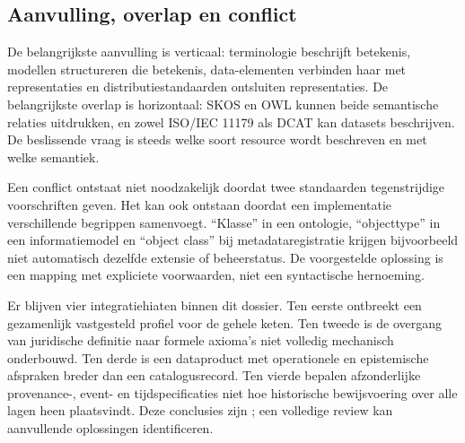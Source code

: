 \subsection{Aanvulling, overlap en conflict}
De belangrijkste aanvulling is verticaal: terminologie beschrijft betekenis, modellen structureren die betekenis, data-elementen verbinden haar met representaties en distributiestandaarden ontsluiten representaties. De belangrijkste overlap is horizontaal: SKOS en OWL kunnen beide semantische relaties uitdrukken, en zowel ISO/IEC 11179 als DCAT kan datasets beschrijven. De beslissende vraag is steeds welke soort resource wordt beschreven en met welke semantiek. \citep{S31,S30,S09,S47}

Een conflict ontstaat niet noodzakelijk doordat twee standaarden tegenstrijdige voorschriften geven. Het kan ook ontstaan doordat een implementatie verschillende begrippen samenvoegt. ``Klasse'' in een ontologie, ``objecttype'' in een informatiemodel en ``object class'' bij metadata\-registratie krijgen bijvoorbeeld niet automatisch dezelfde extensie of beheerstatus. \citep{S30,S13,S08} De voorgestelde oplossing is een mapping met expliciete voorwaarden, niet een syntactische hernoeming.

Er blijven vier integratiehiaten binnen dit dossier. Ten eerste ontbreekt een gezamenlijk vastgesteld profiel voor de gehele keten. Ten tweede is de overgang van juridische definitie naar formele axioma’s niet volledig mechanisch onderbouwd. Ten derde is een dataproduct met operationele en epistemische afspraken breder dan een catalogusrecord. Ten vierde bepalen afzonderlijke provenance-, event- en tijdspecificaties niet hoe historische bewijsvoering over alle lagen heen plaatsvindt. Deze conclusies zijn ; een volledige review kan aanvullende oplossingen identificeren.

